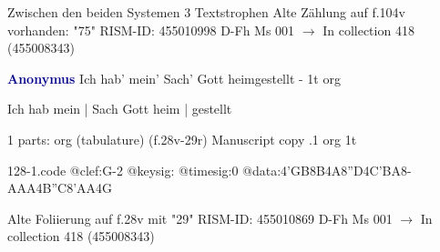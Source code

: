 \documentclass[twocolumn]{book}
\begin{document}
\newline Zwischen den beiden Systemen 3 Textstrophen
\newline Alte Zählung auf f.104v vorhanden: "75"
\newline RISM-ID: 455010998
\newline D-Fh  Ms 001
\newline $\rightarrow$ In collection 418 (455008343)
      
\newline \par \vspace{7pt} \textcolor{darkblue}{\textbf{Anonymus  }}
\newline Ich hab' mein' Sach' Gott heimgestellt - 1t
\newline org
\newline \begin{itshape}[f.28v, at left:] Ich hab mein | Sach Gott heim | gestellt\end{itshape} 
\newline \textcolor{darkblue}{}  1 parts: org (tabulature)  (f.28v-29r)
\newline Manuscript copy
.1  org  1t  
\begin{filecontents*}{128-1.code}
@clef:G-2
@keysig:
@timesig:0
@data:4'GB8B4A8''D4C'BA8-{AAA}4B''C{8'AA}4G
\end{filecontents*}
\newline
%

\newline Alte Foliierung auf f.28v mit "29"
\newline RISM-ID: 455010869
\newline D-Fh  Ms 001
\newline $\rightarrow$ In collection 418 (455008343)
      
\end{document}
